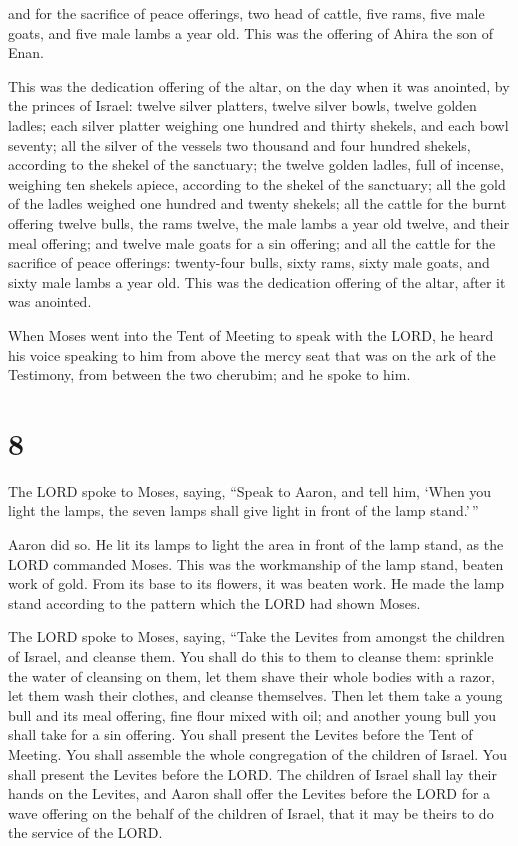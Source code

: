  and for the sacrifice of peace offerings, two head of
cattle, five rams, five male goats, and five male lambs a year old. This
was the offering of Ahira the son of Enan.

 This was the dedication offering of the altar, on the
day when it was anointed, by the princes of Israel: twelve silver
platters, twelve silver bowls, twelve golden ladles; 
each silver platter weighing one hundred and thirty shekels, and each
bowl seventy; all the silver of the vessels two thousand and four
hundred shekels, according to the shekel of the sanctuary;
 the twelve golden ladles, full of incense, weighing ten
shekels apiece, according to the shekel of the sanctuary; all the gold
of the ladles weighed one hundred and twenty shekels; 
all the cattle for the burnt offering twelve bulls, the rams twelve, the
male lambs a year old twelve, and their meal offering; and twelve male
goats for a sin offering;  and all the cattle for the
sacrifice of peace offerings: twenty-four bulls, sixty rams, sixty male
goats, and sixty male lambs a year old. This was the dedication offering
of the altar, after it was anointed.

 When Moses went into the Tent of Meeting to speak with
the LORD, he heard his voice speaking to him from above the mercy seat
that was on the ark of the Testimony, from between the two cherubim; and
he spoke to him.

\hypertarget{section-7}{%
\section{8}\label{section-7}}

 The LORD spoke to Moses, saying,  ``Speak
to Aaron, and tell him, `When you light the lamps, the seven lamps shall
give light in front of the lamp stand.'\,''

 Aaron did so. He lit its lamps to light the area in front
of the lamp stand, as the LORD commanded Moses.  This was
the workmanship of the lamp stand, beaten work of gold. From its base to
its flowers, it was beaten work. He made the lamp stand according to the
pattern which the LORD had shown Moses.

 The LORD spoke to Moses, saying,  ``Take
the Levites from amongst the children of Israel, and cleanse them.
 You shall do this to them to cleanse them: sprinkle the
water of cleansing on them, let them shave their whole bodies with a
razor, let them wash their clothes, and cleanse themselves.
 Then let them take a young bull and its meal offering,
fine flour mixed with oil; and another young bull you shall take for a
sin offering.  You shall present the Levites before the
Tent of Meeting. You shall assemble the whole congregation of the
children of Israel.  You shall present the Levites before
the LORD. The children of Israel shall lay their hands on the Levites,
 and Aaron shall offer the Levites before the LORD for a
wave offering on the behalf of the children of Israel, that it may be
theirs to do the service of the LORD.

